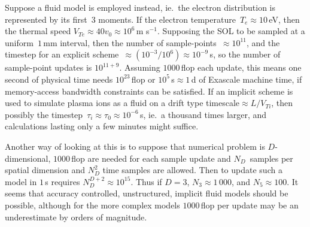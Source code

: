 Suppose a fluid model is employed instead, ie.\ the electron distribution is
represented by its first~$3$ moments.
If the electron temperature~$T_e \approx 10$\,eV, then the
thermal speed $V_{Te}\approx 40 v_0 \approx 10^6$\,m s$^{-1}$. Supposing the SOL to be sampled at a
uniform~$1$\,mm interval, then the
number of sample-points~$\approx 10^{11}$, and the timestep for an explicit scheme~$\approx (10^{-3} /10^6)\approx 10^{-9}$\,s,
so the number of sample-point updates is $10^{11+9}$. Assuming  $1000$\,flop each update, this
means one second of physical time needs $10^{23}$\,flop or $10^5$\,s$\approx 1$\,d
of Exascale machine time, if memory-access bandwidth constraints can be satisfied. If an implicit scheme
is used to simulate plasma ions as a fluid on a drift type timescale$\approx L/V_{Ti}$, then
possibly the timestep~$\tau_i\approx \tau_0\approx 10^{-6}$\,s, ie.\ a thousand times larger, and
calculations lasting only a few minutes might suffice.

Another way of looking at this is to suppose that numerical problem is $D$-dimensional, $1000$\,flop
are needed for each sample update
and $N_D$~samples per spatial dimension and $N_D^2$ time samples are allowed. Then to update
such a model in $1$\,s requires
$N_D^{D+2} \approx 10^{15}$. Thus  if $D=3$, $N_3 \approx 1\,000$, and $N_5 \approx 100$.
It seems that accuracy controlled, unstructured, implicit fluid models should be possible,
although for the more complex models $1000$\,flop per update may be an underestimate by
orders of magnitude.


